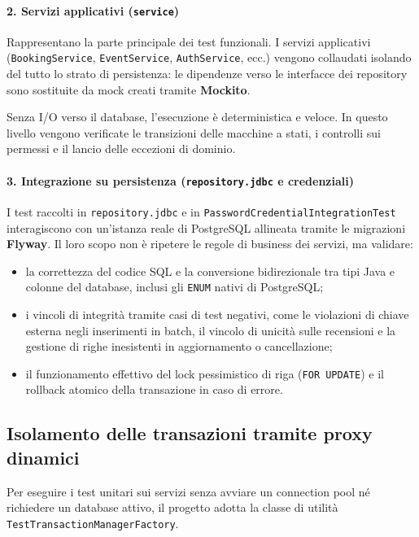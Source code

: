 \paragraph{2. Servizi applicativi (\texttt{service})}
Rappresentano la parte principale dei test funzionali. I servizi applicativi (\texttt{BookingService}, \texttt{EventService}, \texttt{AuthService}, ecc.) vengono collaudati isolando del tutto lo strato di persistenza: le dipendenze verso le interfacce dei repository sono sostituite da mock creati tramite \textbf{Mockito}.

Senza I/O verso il database, l'esecuzione è deterministica e veloce. In questo livello vengono verificate le transizioni delle macchine a stati, i controlli sui permessi e il lancio delle eccezioni di dominio.

\paragraph{3. Integrazione su persistenza (\texttt{repository.jdbc} e credenziali)}
I test raccolti in \texttt{repository.jdbc} e in \texttt{PasswordCredential\allowbreak{}IntegrationTest} interagiscono con un'istanza reale di PostgreSQL allineata tramite le migrazioni \textbf{Flyway}. Il loro scopo non è ripetere le regole di business dei servizi, ma validare:
\begin{itemize}
    \item la correttezza del codice SQL e la conversione bidirezionale tra tipi Java e colonne del database, inclusi gli \texttt{ENUM} nativi di PostgreSQL;
    \item i vincoli di integrità tramite casi di test negativi, come le violazioni di chiave esterna negli inserimenti in batch, il vincolo di unicità sulle recensioni e la gestione di righe inesistenti in aggiornamento o cancellazione;
    \item il funzionamento effettivo del lock pessimistico di riga (\texttt{FOR UPDATE}) e il rollback atomico della transazione in caso di errore.
\end{itemize}

\subsection{Isolamento delle transazioni tramite proxy dinamici}
\label{sec:isolamento-proxy}
Per eseguire i test unitari sui servizi senza avviare un connection pool né richiedere un database attivo, il progetto adotta la classe di utilità \texttt{TestTransactionManagerFactory}.

